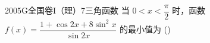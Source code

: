 
\begin{problem}{2005}{G}{全国卷I（理）}{7}{三角函数}
当 $ 0<x<\dfrac{\pi}{2} $ 时，函数 $ f(x)=\dfrac{1+\cos 2x+8\sin^2x}{\sin 2x} $ 的最小值为 (\hspace{1cm})
\begin{choices}
\end{choices}
\end{problem}

\begin{answer}

\end{answer}

\begin{solutions}

\end{solutions}